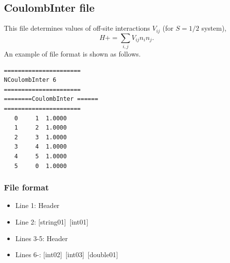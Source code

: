\newpage
\subsection{CoulombInter file}
This file determines values of off-site interactions $V_{ij}$ {(for $S=1/2$ system)},
\begin{equation}
H+=\sum_{i,j}V_{ij} n_ {i}n_{j}.
\end{equation}
An example of file format is shown as follows.

\begin{minipage}{12.5cm}
\begin{screen}
\begin{verbatim}
====================== 
NCoulombInter 6  
====================== 
========CoulombInter ====== 
====================== 
   0     1  1.0000
   1     2  1.0000
   2     3  1.0000
   3     4  1.0000
   4     5  1.0000
   5     0  1.0000
\end{verbatim}
\end{screen}
\end{minipage}

\subsubsection{File format}
 \begin{itemize}
   \item  Line 1:  Header
   \item  Line 2:   [string01]~[int01]
   \item  Lines 3-5:  Header
   \item  Lines 6-: 
   [int02]~[int03]~[double01] 
  \end{itemize}
